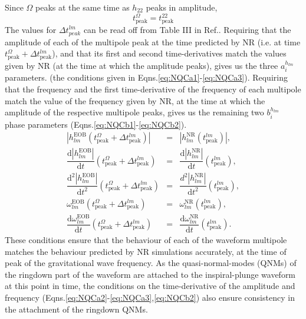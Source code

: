 \documentclass[aps,
prd,
amsmath,
amssymb,
twocolumn,
floatfix,
groupedaddress]{revtex4-1}
\newcommand{\D}{\mathrm{d}}
\newcommand{\peak}{\mathrm{peak}}
\newcommand{\EOB}{\mathrm{EOB}}
\newcommand{\NR}{\mathrm{NR}}
\begin{document}
Since $\Omega$ peaks at the same time as $h_{22}$ peaks in amplitude,
\begin{equation}
t^{\Omega}_{\peak} = t^{22}_{\peak}
\end{equation}
The values for $\Delta t^{lm}_{peak}$ can be read off from Table III in Ref.\citep{BuonannoEOBv2Main}. Requiring that the amplitude of each of the multipole peak at the time predicted by NR (i.e. at time $t^{\Omega}_{\peak}+\Delta t^{lm}_{\peak}$), and that its first and second time-derivatives match the values given by NR (at the time at which the amplitude peaks), gives us the three $a_i^{h_{lm}}$ parameters.  (the conditions given in Eqns.\eqref{eq:NQCa1}-\eqref{eq:NQCa3}). Requiring that the frequency and the first time-derivative of the frequency of each multipole match the value of the frequency given by NR, at the time at which the amplitude of the respective multipole peaks, gives us the remaining two $b_i^{h_{lm}}$ phase parameters (Eqns.\eqref{eq:NQCb1}-\eqref{eq:NQCb2}).
\begin{subequations}
\begin{align}
\left| h^{\EOB}_{lm}(t^{\Omega}_{\peak}+\Delta t^{lm}_{\peak}) \right| &=& \left|h^{\NR}_{lm}(t^{lm}_{\peak})\right|\label{eq:NQCa1},\\
\dfrac{\D\left| h^{\EOB}_{lm} \right|}{\D t}(t^{\Omega}_{\peak}+\Delta t^{lm}_{\peak})  &=& \dfrac{\D\left|h^{\NR}_{lm}\right|}{\D t}(t^{lm}_{\peak})\label{eq:NQCa2},\\
\dfrac{\D^2\left| h^{\EOB}_{lm}\right|}{\D t^2}(t^{\Omega}_{\peak}+\Delta t^{lm}_{\peak})  &=& \dfrac{d^2\left|h^{\NR}_{lm}\right|}{\D t^2}(t^{lm}_{\peak})\label{eq:NQCa3},\\
\omega^{\EOB}_{lm}(t^{\Omega}_{\peak}+\Delta t^{lm}_{\peak}) &=& \omega^{\NR}_{lm}(t^{lm}_{\peak})\label{eq:NQCb1},\\
\dfrac{\D\omega^{\EOB}_{lm}}{\D t}(t^{\Omega}_{\peak}+\Delta t^{lm}_{\peak})  &=& \dfrac{\D\omega^{\NR}_{lm}}{\D t}(t^{lm}_{\peak})\label{eq:NQCb2}.
\end{align}
\end{subequations}
These conditions ensure that the behaviour of each of the waveform multipole matches the behaviour predicted by NR simulations accurately, at the time of peak of the gravitational wave frequency. As the quasi-normal-modes (QNMs) of the ringdown part of the waveform are attached to the inspiral-plunge waveform at this point in time, the conditions on the time-derivative of the amplitude and frequency (Eqns.\eqref{eq:NQCa2}-\eqref{eq:NQCa3},\eqref{eq:NQCb2}) also ensure consistency in the attachment of the ringdown QNMs.
\end{document}
